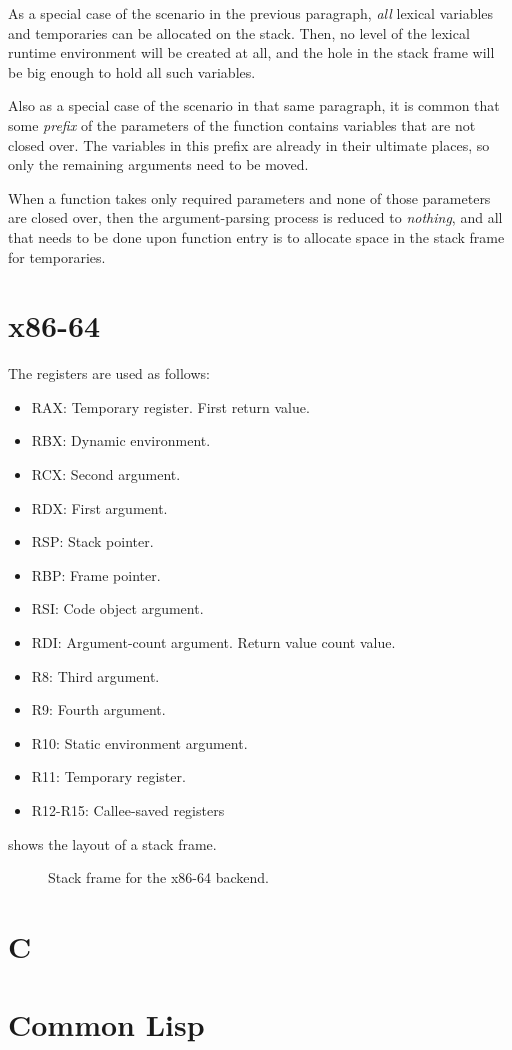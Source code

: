 As a special case of the scenario in the previous paragraph,
\emph{all} lexical variables and temporaries can be allocated on the
stack.  Then, no level of the lexical runtime environment will be
created at all, and the hole in the stack frame will be big enough to
hold all such variables.  

Also as a special case of the scenario in that same paragraph, it is
common that some \emph{prefix} of the parameters of the function
contains variables that are not closed over.  The variables in this
prefix are already in their ultimate places, so only the remaining
arguments need to be moved. 

When a function takes only required parameters and none of those
parameters are closed over, then the argument-parsing process is
reduced to \emph{nothing}, and all that needs to be done upon function
entry is to allocate space in the stack frame for temporaries. 

\section{x86-64}

The registers are used as follows:

\begin{itemize}
\item RAX: Temporary register.  First return value. 
\item RBX: Dynamic environment.
\item RCX: Second argument. 
\item RDX: First argument. 
\item RSP: Stack pointer.
\item RBP: Frame pointer.
\item RSI: Code object argument.
\item RDI: Argument-count argument.  Return value count value.
\item R8: Third argument. 
\item R9: Fourth argument. 
\item R10: Static environment argument.
\item R11: Temporary register.
\item R12-R15: Callee-saved registers
\end{itemize}

 shows the layout of a stack frame. 

\begin{figure}
\begin{center}
\end{center}
\caption{\label{fig-x86-64-stack-frame}
Stack frame for the x86-64 backend.}
\end{figure}


\section{C}

\section{Common Lisp}

